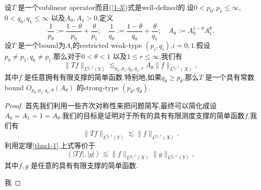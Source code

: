 \begin{theorem}
  设$T$ 是一个sublinear operator而且(\ref{1-3})式是well-defined的.设$0<p_0,p_1\le \infty$,$0<q_0,q_1\le \infty$ 以及$A_0,A_1>0$.定义
  \[
    \frac{1}{p_\theta}:=\frac{1-\theta}{p_0}+\frac{\theta}{p_1};\quad \frac{1}{q_\theta}:=\frac{1-\theta}{q_0}+\frac{\theta}{q_1};\quad A_\theta:=A_0^{1-\theta}A_1^{\theta}.
  \] 
  设$T$ 是一个bound为$A_i$的restricted weak-type $(p_i,q_i)$,$i=0,1$.假设 $p_0\neq p_1,q_0\neq p_1$.那么对于$0<\theta<1$ 以及$1\le r\le \infty$,我们有
  \[
    \|Tf\|_{L^{q_\theta,r}(Y)}\lesssim_{p_0,p_1,q_0,q_1,r} A_{\theta}\|f\|_{L^{p_\theta,r}(X)},
  \] 
  其中$f$ 是任意拥有有限支撑的简单函数.特别地,如果$q_\theta\ge p_\theta$,那么$T$ 是一个具有常数bound $O_{p_0,p_1,q_1,\theta}(A_\theta)$ 的strong-type $(p_\theta,q_\theta)$.
\end{theorem}
\begin{proof}
  首先我们利用一些齐次对称性来把问题简写,最终可以简化成设$A_0=A_1=1=A_\theta$.我们的目标是证明对于所有的具有有限测度支撑的简单函数$f$,我们有
  \[
    \|Tf\|_{L^{q_\theta,r}(Y)}\lesssim \|f\|_{L^{p_\theta,r}(X)}.
  \]
  利用定理\ref{thm1-1},上式等价于
  \begin{equation}
    \left<|Tf|,|g| \right>\lesssim \|f\|_{L^{p_\theta,r}(X)}\|g\|_{L^{q^{\prime}_{\theta},r^{\prime}}(Y)},
  \end{equation}
  其中$f,g$ 是任意的具有有限支撑的简单函数.

  \noindent 我
\end{proof}

